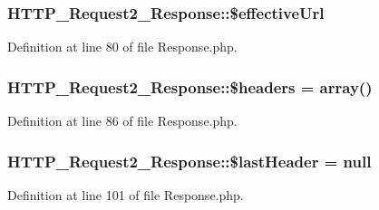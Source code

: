 \subsubsection[{\$effective\+Url}]{\setlength{\rightskip}{0pt plus 5cm}H\+T\+T\+P\+\_\+\+Request2\+\_\+\+Response\+::\$effective\+Url\hspace{0.3cm}{\ttfamily [protected]}}\label{classHTTP__Request2__Response_ab87ff3f614066accc95a6f29f23bc051}


Definition at line 80 of file Response.\+php.

\hypertarget{classHTTP__Request2__Response_a17017d7d7f6452267ba57ecd0e10fa35}{}
\subsubsection[{\$headers}]{\setlength{\rightskip}{0pt plus 5cm}H\+T\+T\+P\+\_\+\+Request2\+\_\+\+Response\+::\$headers = array()\hspace{0.3cm}{\ttfamily [protected]}}\label{classHTTP__Request2__Response_a17017d7d7f6452267ba57ecd0e10fa35}


Definition at line 86 of file Response.\+php.

\hypertarget{classHTTP__Request2__Response_adcf7a1e02f6e5d9eac767466f8551a1e}{}
\subsubsection[{\$last\+Header}]{\setlength{\rightskip}{0pt plus 5cm}H\+T\+T\+P\+\_\+\+Request2\+\_\+\+Response\+::\$last\+Header = null\hspace{0.3cm}{\ttfamily [protected]}}\label{classHTTP__Request2__Response_adcf7a1e02f6e5d9eac767466f8551a1e}


Definition at line 101 of file Response.\+php.

\hypertarget{classHTTP__Request2__Response_ad9a8fd735e8dc89eb7afc73750ec0bbc}{}
